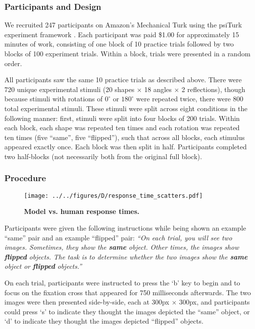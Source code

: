 \documentclass[10pt,letterpaper]{article}
\begin{document}
\subsubsection{Participants and Design}

We recruited 247 participants on Amazon's Mechanical Turk using the
psiTurk experiment framework \cite{Mcdonnell12}. Each participant was
paid \$1.00 for approximately 15 minutes of work, consisting of one
block of 10 practice trials followed by two blocks of 100 experiment
trials. Within a block, trials were presented in a random order.

All participants saw the same 10 practice trials as described
above. There were 720 unique experimental stimuli (20 shapes $\times$
18 angles $\times$ 2 reflections), though because stimuli with
rotations of $0^\circ$ or $180^\circ$ were repeated twice, there were
800 total experimental stimuli. These stimuli were split across eight
conditions in the following manner: first, stimuli were split into
four blocks of 200 trials. Within each block, each shape was repeated
ten times and each rotation was repeated ten times (five ``same'',
five ``flipped''), such that across all blocks, each stimulus appeared
exactly once. Each block was then split in half. Participants
completed two half-blocks (not necessarily both from the original full
block).

\subsubsection{Procedure}

\begin{figure*}[t]
  \begin{center}
    \texttt{[image: ../../figures/D/response\_time\_scatters.pdf]}
    \caption{\textbf{Model vs. human response times.}}
    \label{fig:human-model-scatters}
  \end{center}
\end{figure*}

Participants were given the following instructions while being shown
an example ``same'' pair and an example ``flipped'' pair: \textit{``On
  each trial, you will see two images. Sometimes, they show the
  \textbf{same} object. Other times, the images show \textbf{flipped}
  objects. The task is to determine whether the two images show the
  \textbf{same} object or \textbf{flipped} objects.''}

On each trial, participants were instructed to press the `b' key to
begin and to focus on the fixation cross that appeared for 750
milliseconds afterwards. The two images were then presented
side-by-side, each at 300px $\times$ 300px, and participants could
press `s' to indicate they thought the images depicted the ``same''
object, or `d' to indicate they thought the images depicted
``flipped'' objects.
\end{document}
